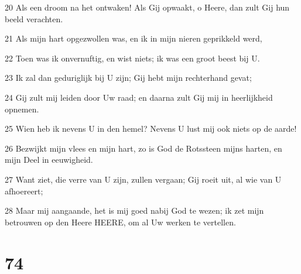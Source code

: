 \par 20 Als een droom na het ontwaken! Als Gij opwaakt, o Heere, dan zult Gij hun beeld verachten.
\par 21 Als mijn hart opgezwollen was, en ik in mijn nieren geprikkeld werd,
\par 22 Toen was ik onvernuftig, en wist niets; ik was een groot beest bij U.
\par 23 Ik zal dan geduriglijk bij U zijn; Gij hebt mijn rechterhand gevat;
\par 24 Gij zult mij leiden door Uw raad; en daarna zult Gij mij in heerlijkheid opnemen.
\par 25 Wien heb ik nevens U in den hemel? Nevens U lust mij ook niets op de aarde!
\par 26 Bezwijkt mijn vlees en mijn hart, zo is God de Rotssteen mijns harten, en mijn Deel in eeuwigheid.
\par 27 Want ziet, die verre van U zijn, zullen vergaan; Gij roeit uit, al wie van U afhoereert;
\par 28 Maar mij aangaande, het is mij goed nabij God te wezen; ik zet mijn betrouwen op den Heere HEERE, om al Uw werken te vertellen.

\chapter{74}

